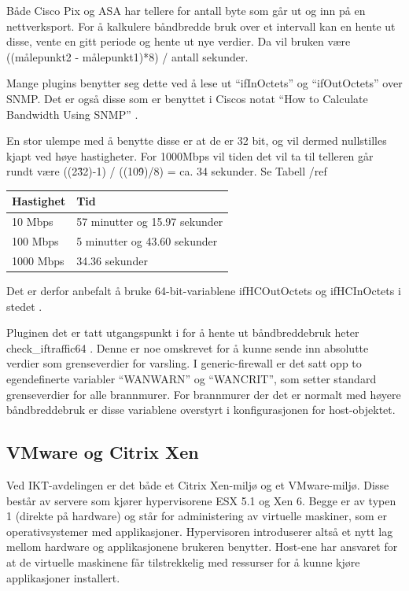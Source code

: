 Både Cisco Pix og ASA har tellere for antall byte som går ut og inn på en nettverksport. For å kalkulere båndbredde bruk over et intervall kan en hente ut disse, vente en gitt periode og hente ut nye verdier. Da vil bruken være ((målepunkt2 - målepunkt1)*8) / antall sekunder.

Mange plugins benytter seg dette ved å lese ut “ifInOctets” og “ifOutOctets” over SNMP. Det er også disse som er benyttet i Ciscos notat “How to Calculate Bandwidth Using SNMP” \cite{ciscobandwidth}. 

En stor ulempe med å benytte disse er at de er 32 bit, og vil dermed nullstilles kjapt ved høye hastigheter. For 1000Mbps vil tiden det vil ta til telleren går rundt være ((2\^32)-1) / ((10\^9)/8) = ca. 34 sekunder. Se Tabell /ref 
\begin{table}
\begin{center}
\begin{tabular}{ | l | p{7cm} |} 
        \textbf{Hastighet} & \textbf{Tid}
	\\ \hline
        10 Mbps & 57 minutter og 15.97 sekunder \\ \hline  
        100 Mbps & 5 minutter og 43.60 sekunder \\ \hline
	1000 Mbps & 34.36 sekunder \\ 
	\hline
\end{tabular}
\label{kalkulering_teller}
\end{center}
\end{table}
Det er derfor anbefalt å bruke 64-bit-variablene ifHCOutOctets og ifHCInOctets i stedet \cite{ciscosnmpcounters}.

Pluginen det er tatt utgangspunkt i for å hente ut båndbreddebruk heter check\_iftraffic64 \cite{checkciscoif}. Denne er noe omskrevet for å kunne sende inn absolutte verdier som grenseverdier for varsling. I generic-firewall er det satt opp to egendefinerte variabler “WANWARN” og “WANCRIT”, som setter standard grenseverdier for alle brannmurer. For brannmurer der det er normalt med høyere båndbreddebruk er disse variablene overstyrt i konfigurasjonen for host-objektet.

\subsection{VMware og Citrix Xen}

Ved IKT-avdelingen er det både et Citrix Xen-miljø og et VMware-miljø. Disse består av servere som kjører hypervisorene ESX 5.1 og Xen 6. Begge er av typen 1 (direkte på hardware) og står for administering av virtuelle maskiner, som er operativsystemer med applikasjoner. Hypervisoren introduserer altså  et nytt lag mellom hardware og applikasjonene brukeren benytter. Host-ene har ansvaret for at de virtuelle maskinene får tilstrekkelig med ressurser for å kunne kjøre applikasjoner installert. 

